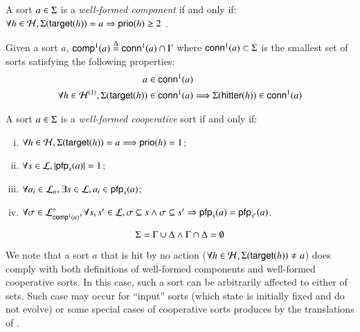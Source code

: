 \begin{definition}
\label{def:component}
A sort $a \in \PHs$ is a \emph{well-formed component} if and only if:
    $\forall h \in \PHh, \PHsort(\PHtarget(h)) = a \Rightarrow \prio(h) \geq 2$ \enspace.
\end{definition}

\begin{definition}
\label{def:conn}
Given a sort $a$, $\compin(a)\DEF \conn(a)\cap\components$ where
$\conn(a) \subset \PHs$ is the smallest set of sorts satisfying the following properties:
\begin{align*}
a\in\conn(a) &
\\
\forall h\in  \PHh^{(1)},
	\Sigma(\target{h})\in\conn(a) & \Longrightarrow \Sigma(\hitter{h})\in\conn(a)
\end{align*}
\end{definition}

\begin{definition}
\label{def:cs}
A sort $a \in \PHs$ is a \emph{well-formed cooperative} sort if and only if:
\begin{enumerate}[(i)]
\item $\forall h\in\PHh, \Sigma(\PHtarget(h))=a \Longrightarrow \prio(h) = 1$;
\item\label{csai} $\forall s\in\PHl, \card{\pfp_s(a)} = 1$;
\item\label{css} $\forall a_i \in \PHl_a, \exists s \in \PHl, a_i\in\pfp_s(a)$;
\item $\forall \sigma\in\PHsubl[\PHl]_{\compin(a)},
			\forall s,s'\in\PHl,
				\sigma\subseteq s\wedge \sigma\subseteq s'\Rightarrow 
							\pfp_s(a) = \pfp_{s'}(a)$\enspace.
\end{enumerate}
\end{definition}

\begin{condition}
\label{cr:compcs}
  $$\PHs = \components \cup \cs \wedge \components \cap \cs = \emptyset$$
\end{condition}

We note that a sort $a$ that is hit by no action (\ie $\forall h \in \PHh, \PHsort(\target{h}) \neq a$)
does comply with both definitions of well-formed components and well-formed cooperative sorts.
In this case, such a sort can be arbitrarily affected to either of sets.
Such case may occur for “input” sorts (which state is initially fixed and do not evolve)
or some special cases of cooperative sorts produces by the translations of .

